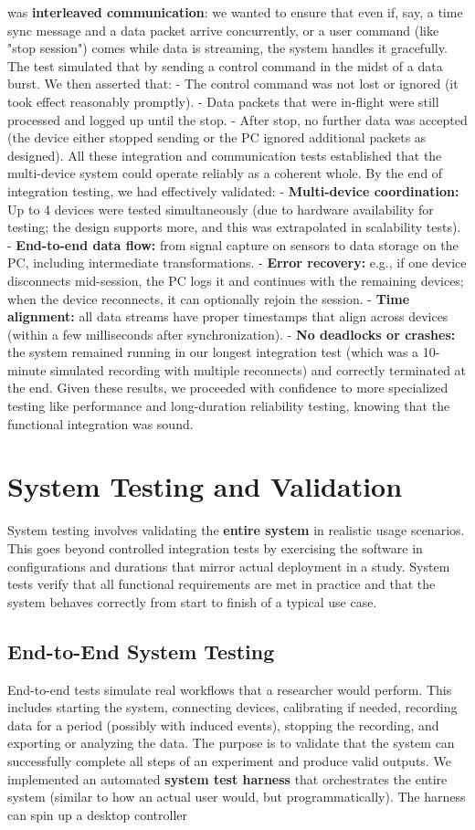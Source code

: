 was \textbf{interleaved communication}: we wanted to ensure that even if, say, a time sync message and a data packet arrive concurrently, or a user command (like "stop session") comes while data is streaming, the system handles it gracefully. The test simulated that by sending a control command in the midst of a data burst. We then asserted that: - The control command was not lost or ignored (it took effect reasonably promptly). - Data packets that were in-flight were still processed and logged up until the stop. - After stop, no further data was accepted (the device either stopped sending or the PC ignored additional packets as designed). All these integration and communication tests established that the multi-device system could operate reliably as a coherent whole. By the end of integration testing, we had effectively validated: - \textbf{Multi-device coordination:} Up to 4 devices were tested simultaneously (due to hardware availability for testing; the design supports more, and this was extrapolated in scalability tests). - \textbf{End-to-end data flow:} from signal capture on sensors to data storage on the PC, including intermediate transformations. - \textbf{Error recovery:} e.g., if one device disconnects mid-session, the PC logs it and continues with the remaining devices; when the device reconnects, it can optionally rejoin the session. - \textbf{Time alignment:} all data streams have proper timestamps that align across devices (within a few milliseconds after synchronization). - \textbf{No deadlocks or crashes:} the system remained running in our longest integration test (which was a 10-minute simulated recording with multiple reconnects) and correctly terminated at the end. Given these results, we proceeded with confidence to more specialized testing like performance and long-duration reliability testing, knowing that the functional integration was sound. \section{System Testing and Validation} System testing involves validating the \textbf{entire system} in realistic usage scenarios. This goes beyond controlled integration tests by exercising the software in configurations and durations that mirror actual deployment in a study. System tests verify that all functional requirements are met in practice and that the system behaves correctly from start to finish of a typical use case. \subsection{End-to-End System Testing} End-to-end tests simulate real workflows that a researcher would perform. This includes starting the system, connecting devices, calibrating if needed, recording data for a period (possibly with induced events), stopping the recording, and exporting or analyzing the data. The purpose is to validate that the system can successfully complete all steps of an experiment and produce valid outputs. We implemented an automated \textbf{system test harness} that orchestrates the entire system (similar to how an actual user would, but programmatically). The harness can spin up a desktop controller 